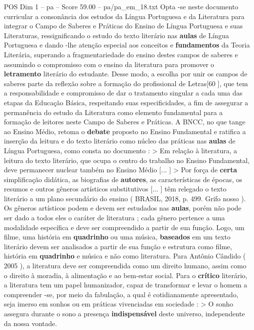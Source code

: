 \begin{textsample}{POS Dim 1 – pa – Score 59.00 – pa/pa\_em\_18.txt}
Opta -se neste documento curricular a consonância dos estudos da Língua Portuguesa e da Literatura para integrar o Campo de Saberes e Práticas do Ensino de Língua Portuguesa e suas Literaturas, ressignificando o estudo do texto literário nas \textbf{aulas} de Língua Portuguesa e dando -lhe atenção especial aos conceitos e \textbf{fundamentos} da Teoria Literária, superando a fragmentariedade do ensino destes campos de saberes e assumindo o compromisso com o ensino da literatura para promover o \textbf{letramento} literário do estudante.
Desse modo, a escolha por unir os campos de saberes parte da reflexão sobre a formação do profissional de Letras[60 ], que tem a responsabilidade e compromisso de dar o tratamento singular a cada uma das etapas da Educação Básica, respeitando suas especificidades, a fim de assegurar a permanência do estudo da Literatura como elemento fundamental para a formação de leitores neste Campo de Saberes e Práticas.
A BNCC, no que tange ao Ensino Médio, retoma o \textbf{debate} proposto no Ensino Fundamental e ratifica a inserção da leitura e do texto literário como núcleo das práticas nas \textbf{aulas} de Língua Portuguesa, como consta no documento : > Em relação à literatura, a leitura do texto literário, que ocupa o centro do trabalho no Ensino Fundamental, deve permanecer nuclear também no Ensino Médio [... ] > Por força de \textbf{certa} simplificação didática, as biografias de \textbf{autores}, as características de épocas, os resumos e outros gêneros artísticos substitutivos [... ] têm relegado o texto literário a um plano secundário do ensino ( BRASIL, 2018, p. 499.
Grifo nosso ).
Os gêneros artísticos podem e devem ser estudados nas \textbf{aulas}, porém não pode ser dado a todos eles o caráter de literatura ; cada gênero pertence a uma modalidade específica e deve ser compreendido a partir de sua função.
Logo, um filme, uma história em \textbf{quadrinho} ou uma música, \textbf{baseados} em um texto literário devem ser analisados a partir de sua função e estrutura como filme, história em \textbf{quadrinho} e música e não como literatura.
Para Antônio Cândido ( 2005 ), a literatura deve ser compreendida como um direito humano, assim como o direito à moradia, à alimentação e ao bem-estar social.
Para o \textbf{crítico} literário, a literatura tem um papel humanizador, capaz de transformar e levar o homem a compreender -se, por meio da fabulação, a qual é cotidianamente apresentado, seja imerso em sonhos ou em práticas vivenciadas em sociedade : > O sonho assegura durante o sono a presença \textbf{indispensável} deste universo, independente da nossa vontade.

\end{textsample}
